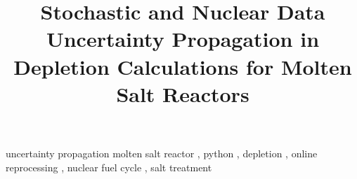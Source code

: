 \documentclass[review]{elsarticle}
\begin{document}
\begin{frontmatter}
\title{Stochastic and Nuclear Data Uncertainty Propagation in Depletion 
Calculations for Molten Salt Reactors}

\date{}                     %




	
\begin{keyword}
uncertainty propagation
molten salt reactor \sep
python \sep 
depletion \sep 
online reprocessing \sep 
nuclear fuel cycle \sep
salt treatment
\end{keyword}


\end{frontmatter}
\glsresetall

\linenumbers


\FloatBarrier
%
%
%
%
%


\end{document}
